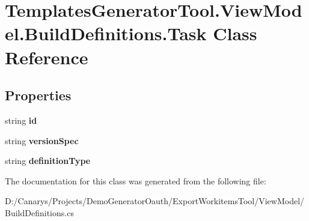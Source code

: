 \hypertarget{class_templates_generator_tool_1_1_view_model_1_1_build_definitions_1_1_task}{}\section{Templates\+Generator\+Tool.\+View\+Model.\+Build\+Definitions.\+Task Class Reference}
\label{class_templates_generator_tool_1_1_view_model_1_1_build_definitions_1_1_task}
\subsection*{Properties}
\begin{DoxyCompactItemize}
\item 
\mbox{\label{class_templates_generator_tool_1_1_view_model_1_1_build_definitions_1_1_task_a1b86133118e588f4e79f5d9cae32a0eb}} 
string {\bfseries id}
\item 
\mbox{\label{class_templates_generator_tool_1_1_view_model_1_1_build_definitions_1_1_task_a16bb0b0fe0d42e8c525730330ef80c1d}} 
string {\bfseries version\+Spec}
\item 
\mbox{\label{class_templates_generator_tool_1_1_view_model_1_1_build_definitions_1_1_task_a9cd4064db86e36f39c3f38346f759b8a}} 
string {\bfseries definition\+Type}
\end{DoxyCompactItemize}


The documentation for this class was generated from the following file\+:\begin{DoxyCompactItemize}
\item 
D\+:/\+Canarys/\+Projects/\+Demo\+Generator\+Oauth/\+Export\+Workitems\+Tool/\+View\+Model/Build\+Definitions.\+cs\end{DoxyCompactItemize}
